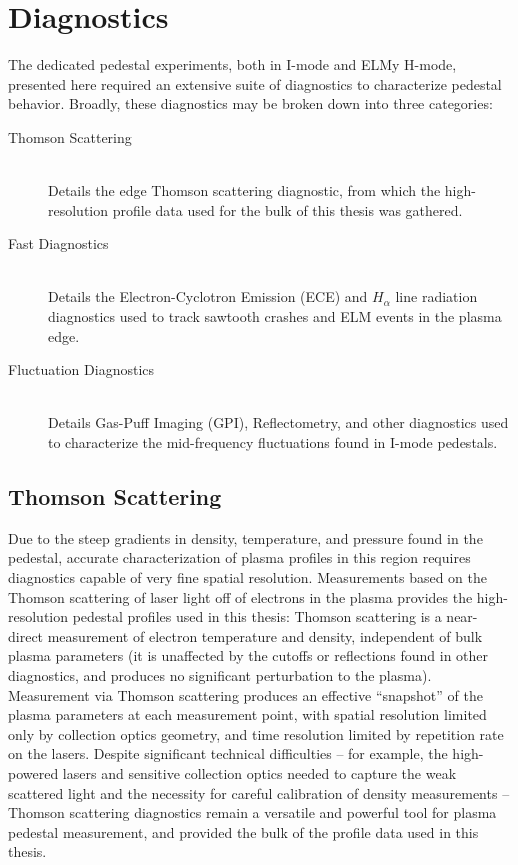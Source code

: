 \chapter{Diagnostics}\label{app:Diagnostics}

The dedicated pedestal experiments, both in I-mode and ELMy H-mode, presented here required an extensive suite of diagnostics to characterize pedestal behavior.  Broadly, these diagnostics may be broken down into three categories:

\begin{description}
 \item[Thomson Scattering] \hfill \\
 Details the edge Thomson scattering diagnostic, from which the high-resolution profile data used for the bulk of this thesis was gathered.
 \item[Fast Diagnostics] \hfill \\
 Details the Electron-Cyclotron Emission (ECE) and $H_\alpha$ line radiation diagnostics used to track sawtooth crashes and ELM events in the plasma edge.
 \item[Fluctuation Diagnostics] \hfill \\
 Details Gas-Puff Imaging (GPI), Reflectometry, and other diagnostics used to characterize the mid-frequency fluctuations found in I-mode pedestals.\nicesectionending
\end{description}

\section{Thomson Scattering}\label{sec:app_ts}

Due to the steep gradients in density, temperature, and pressure found in the pedestal, accurate characterization of plasma profiles in this region requires diagnostics capable of very fine spatial resolution.  Measurements based on the Thomson scattering \cite{Sheffield} of laser light off of electrons in the plasma provides the high-resolution pedestal profiles used in this thesis: Thomson scattering is a near-direct measurement of electron temperature and density, independent of bulk plasma parameters (\ie it is unaffected by the cutoffs or reflections found in other diagnostics, and produces no significant perturbation to the plasma).  Measurement via Thomson scattering produces an effective ``snapshot'' of the plasma parameters at each measurement point, with spatial resolution limited only by collection optics geometry, and time resolution limited by repetition rate on the lasers.  Despite significant technical difficulties -- for example, the high-powered lasers and sensitive collection optics needed to capture the weak scattered light and the necessity for careful calibration of density measurements -- Thomson scattering diagnostics remain a versatile and powerful tool for plasma pedestal measurement, and provided the bulk of the profile data used in this thesis.

